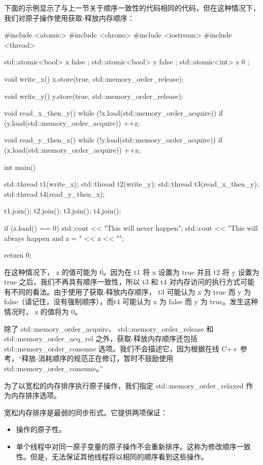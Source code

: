 下面的示例显示了与上一节关于顺序一致性的代码相同的代码，但在这种情况下，我们对原子操作使用获取-释放内存顺序：

\begin{cpp}
#include <atomic>
#include <chrono>
#include <iostream>
#include <thread>

std::atomic<bool> x{ false };
std::atomic<bool> y{ false };
std::atomic<int> z{ 0 };

void write_x() {
    x.store(true, std::memory_order_release);
}

void write_y() {
    y.store(true, std::memory_order_release);
}

void read_x_then_y() {
    while (!x.load(std::memory_order_acquire)) {}
    if (y.load(std::memory_order_acquire)) {
        ++z;
    }
}

void read_y_then_x() {
    while (!y.load(std::memory_order_acquire)) {}
    if (x.load(std::memory_order_acquire)) {
        ++z;
    }
}

int main() {
    std::thread t1(write_x);
    std::thread t2(write_y);
    std::thread t3(read_x_then_y);
    std::thread t4(read_y_then_x);

    t1.join();
    t2.join();
    t3.join();
    t4.join();

    if (z.load() == 0) {
        std::cout << "This will never happen\n";
    } {
        std::cout << "This will always happen and z = " << z << "\n";
    }

    return 0;
}
\end{cpp}

在这种情况下， z 的值可能为 0。因为在 t1 将 x 设置为 true 并且 t2 将 y 设置为 true 之后，我们不再具有顺序一致性，所以 t3 和 t4 对内存访问的执行方式可能有不同的看法。由于使用了获取-释放内存顺序， t3 可能认为 x 为 true 而 y 为 false（请记住，没有强制顺序），而t4 可能认为 x 为 false 而 y 为 true。发生这种情况时， z 的值将为 0。

除了 std::memory\_order\_acquire、 std::memory\_order\_release 和 std::memory\_order\_acq\_rel 之外，获取-释放内存顺序还包括 std::memory\_order\_consume 选项。我们不会描述它，因为根据在线 C++ 参考，“释放-消耗顺序的规范正在修订，暂时不鼓励使用 std::memory\_order\_consume。”


为了以宽松的内存排序执行原子操作，我们指定 std::memory\_order\_relaxed 作为内存排序选项。

宽松内存排序是最弱的同步形式。它提供两项保证：

\begin{itemize}
\item
操作的原子性。

\item
单个线程中对同一原子变量的原子操作不会重新排序。这称为修改顺序一致性。但是，无法保证其他线程将以相同的顺序看到这些操作。
\end{itemize}

